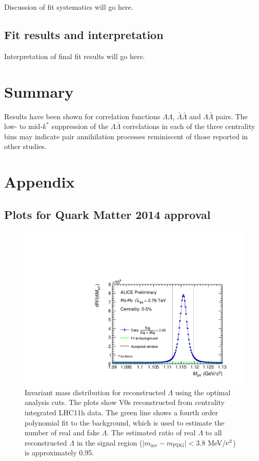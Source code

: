 Discussion of fit systematics will go here.

\subsection{Fit results and interpretation}
\label{sec:FitResults}

Interpretation of final fit results will go here.

\section{Summary}
Results have been shown for correlation functions $\Lambda\Lambda$, $\bar{\Lambda}\bar{\Lambda}$ and $\Lambda\bar{\Lambda}$ pairs.  The low- to mid-$k^*$ suppression of the $\Lambda\bar{\Lambda}$ correlations in each of the three centrality bins may indicate pair annihilation processes reminiscent of those reported in other studies.

\section{Appendix}
\subsection{Plots for Quark Matter 2014 approval}
\begin{figure}[hbtp]
\includegraphics[width=36pc]{Figures/2014-05-11-LamMinv-CommentCorrections.pdf}
\caption[$\Lambda$ invariant mass distribution]{Invariant mass distribution for reconstructed $\Lambda$ using the optimal analysis cuts.  The plots show V0s reconstructed from centrality integrated LHC11h data.  The green line shows a fourth order polynomial fit to the background, which is used to estimate the number of real and fake $\Lambda$.  The estimated ratio of real $\Lambda$ to all reconstructed $\Lambda$ in the signal region ($ \lvert m_{\mathrm{inv}} - m_{\mathrm{PDG}}\rvert < 3.8$ MeV/$\rm c^2$) is approximately 0.95.}
\label{fig:AppendixLamInvMass}
\end{figure}

